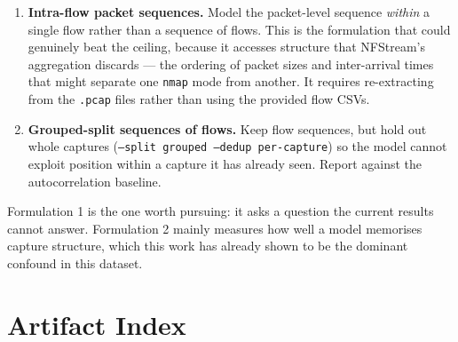 \documentclass[11pt, a4paper]{article}
\newenvironment{tightenum}%
    {\begin{enumerate}[leftmargin=1.6em, itemsep=0.3em]}{\end{enumerate}}
\newenvironment{tightenum}{\begin{enumerate}}{\end{enumerate}}
\begin{document}
\begin{tightenum}
  \item \textbf{Intra-flow packet sequences.} Model the packet-level sequence
        \emph{within} a single flow rather than a sequence of flows. This is the
        formulation that could genuinely beat the ceiling, because it accesses
        structure that NFStream's aggregation discards --- the ordering of packet
        sizes and inter-arrival times that might separate one \texttt{nmap} mode
        from another. It requires re-extracting from the \texttt{.pcap} files
        rather than using the provided flow CSVs.
  \item \textbf{Grouped-split sequences of flows.} Keep flow sequences, but hold
        out whole captures (\texttt{--split grouped --dedup per-capture}) so the
        model cannot exploit position within a capture it has already seen.
        Report against the autocorrelation baseline.
\end{tightenum}

\noindent
Formulation 1 is the one worth pursuing: it asks a question the current results
cannot answer. Formulation 2 mainly measures how well a model memorises capture
structure, which this work has already shown to be the dominant confound in this
dataset.

\section*{Artifact Index}
\end{document}
